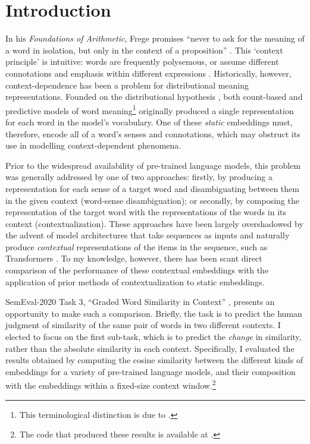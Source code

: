 \section{Introduction}
\label{sec:introduction}

In his \emph{Foundations of Arithmetic}, Frege promises ``never to ask for the meaning
of a word in isolation, but only in the context of a proposition''
\parencite*[xvii]{Frege1960}.
This `context principle' is intuitive: words are frequently polysemous, or assume
different connotations and emphasis within different expressions
\parencite[2-3]{Armendariz2020}.
Historically, however, context-dependence has been a problem for distributional meaning
representations.
Founded on the distributional hypothesis \parencite[e.g.,][142-143]{Turney2010}, both
count-based and predictive models of word meaning\footnote{This terminological
  distinction is due to \textcite{Baroni2014a}.
} originally
produced a single representation for each word in the model's vocabulary.
One of these \emph{static} embeddings must, therefore, encode all of a word's senses
and connotations, which may obstruct its use in modelling context-dependent phenomena.

Prior to the widespread availability of pre-trained language models, this problem was
generally addressed by one of two approaches: firstly, by producing a representation
for each sense of a target word and disambiguating between them in the given context
(word-sense disambiguation); or secondly, by composing the representation of the target
word with the representations of the words in its context (contextualization).
These approaches have been largely overshadowed by the advent of model architectures
that take sequences as inputs and naturally produce \emph{contextual} representations
of the items in the sequence, such as Transformers \parencite{Vaswani2017}.
To my knowledge, however, there has been scant direct comparison of the performance of
these contextual embeddings with the application of prior methods of contextualization
to static embeddings.

SemEval-2020 Task 3, ``Graded Word Similarity in Context'' \parencite{Armendariz2020a},
presents an opportunity to make such a comparison.
Briefly, the task is to predict the human judgment of similarity of the same pair of
words in two different contexts.
I elected to focus on the first sub-task, which is to predict the \emph{change} in
similarity, rather than the absolute similarity in each context.
Specifically, I evaluated the results obtained by computing the cosine similarity
between the different kinds of embeddings for a variety of pre-trained language models,
and their composition with the embeddings within a fixed-size context
window.\footnote{The code that produced these results is available at
  .
}
